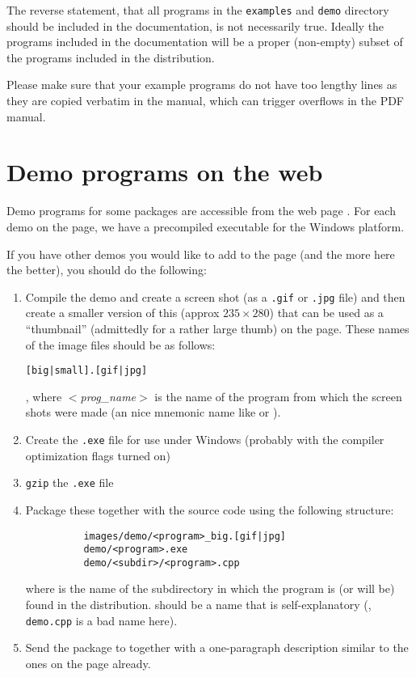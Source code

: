 The reverse statement, that all programs in the \texttt{examples}
and \texttt{demo} directory should be included in the documentation,
is not necessarily true.  Ideally the programs included in the documentation
will be a proper (non-empty) subset of the programs included in the 
distribution.

Please make sure that your example programs do not have too lengthy lines
as they are copied verbatim in the manual, which can trigger overflows
in the PDF manual.

\section{Demo programs on the web\label{sec:demos_web_page}}

Demo programs for some packages are accessible from the 
web page .
For each demo on the page, we have a precompiled executable for the
Windows platform.  

If you have other demos you would like to add to the page (and the more 
here the better), you should do the following:
\begin{enumerate}
\item Compile the demo and create a screen shot (as a \texttt{.gif} or 
      \texttt{.jpg} file) and then create a smaller version of this 
      (approx $235 \times 280$) that can be used as a ``thumbnail'' 
      (admittedly for a rather large thumb) on the page.  These names of
      the image files should be as follows: 
      \centerline{\texttt{[big|small].[gif|jpg]}},
      where \textit{$<$prog\_name$>$} is the name of the program from which
      the screen shots were made (an nice mnemonic name like 
       or ).

\item Create the \texttt{.exe} file for use under Windows (probably with the 
      compiler optimization flags turned on)
\item \texttt{gzip} the \texttt{.exe} file
\item Package these together with the source code using the following structure:
      \begin{verbatim}
          images/demo/<program>_big.[gif|jpg]
          demo/<program>.exe
          demo/<subdir>/<program>.cpp
      \end{verbatim}
      where  is the name of the subdirectory in which the program
      is (or will be) found in the distribution.  should be a 
      name that is self-explanatory (\eg, \texttt{demo.cpp} is a bad name here).

\item Send the package to  together with a one-paragraph description similar to the
      ones on the page already.
\end{enumerate}

